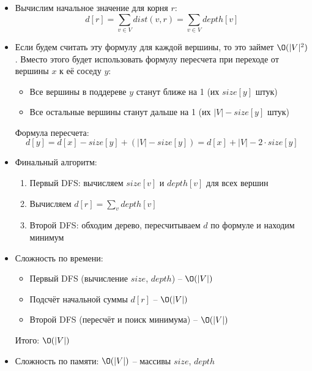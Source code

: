 \begin{enumerate}
\begin{enumerate}
\begin{itemize}
          \item Вычислим начальное значение для корня $r$:
          $$d[r] = \sum_{v \in V} dist(v, r) = \sum_{v \in V} depth[v]$$

          \item Если будем считать эту формулу для каждой вершины, то это займет $\O(|V|^2)$. 
          Вместо этого будет использовать формулу пересчета при переходе от вершины $x$ к её соседу $y$:
          
          \begin{itemize}
            \item Все вершины в поддереве $y$ станут ближе на 1 (их $size[y]$ штук)
            \item Все остальные вершины станут дальше на 1 (их $|V| - size[y]$ штук)
          \end{itemize}
          
          Формула пересчета:
          $$d[y] = d[x] - size[y] + (|V| - size[y]) = d[x] + |V| - 2 \cdot size[y]$$

          \item Финальный алгоритм:
          \begin{enumerate}
            \item Первый DFS: вычисляем $size[v]$ и $depth[v]$ для всех вершин
            \item Вычисляем $d[r] = \sum_{v} depth[v]$
            \item Второй DFS: обходим дерево, пересчитываем $d$ по формуле и находим минимум
          \end{enumerate}

          \item Сложность по времени:
          \begin{itemize}
            \item Первый DFS (вычисление $size$, $depth$) -- $\O(|V|)$
            \item Подсчёт начальной суммы $d[r]$ -- $\O(|V|)$
            \item Второй DFS (пересчёт и поиск минимума) -- $\O(|V|)$
          \end{itemize}
          
          Итого: $\O(|V|)$
          
          \item Сложность по памяти: $\O(|V|)$ -- массивы $size$, $depth$
        
        \end{itemize}

    \end{enumerate}

\end{enumerate}
